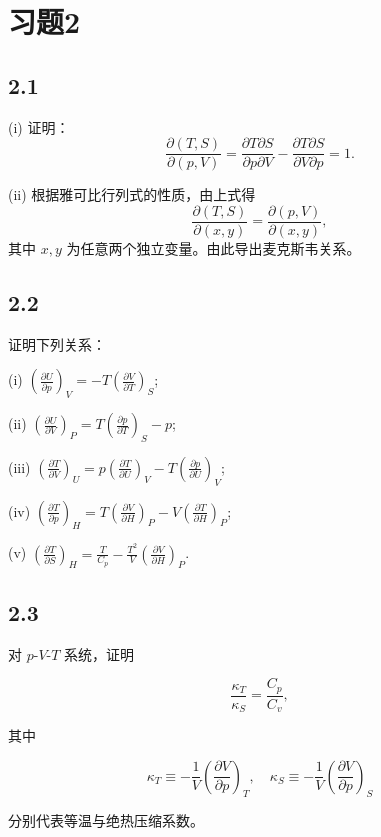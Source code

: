 \section{习题2}

\newpage
\subsection{2.1}
(i) 证明：$$\frac{\partial (T, S)}{\partial (p, V)} = \frac{\partial T \partial S}{\partial p \partial V} - \frac{\partial T \partial S}{\partial V \partial p} = 1.$$

(ii) 根据雅可比行列式的性质，由上式得 $$\frac{\partial (T, S)}{\partial (x, y)} = \frac{\partial (p, V)}{\partial (x, y)},$$ 其中 $x, y$ 为任意两个独立变量。由此导出麦克斯韦关系。

\newpage
\subsection{2.2}
证明下列关系：

(i) $\left( \frac{\partial U}{\partial p} \right)_V = - T \left( \frac{\partial V}{\partial T} \right)_S$;

(ii) $\left( \frac{\partial U}{\partial V} \right)_P = T \left( \frac{\partial p}{\partial T} \right)_S - p$;

(iii) $\left( \frac{\partial T}{\partial V} \right)_U = p \left( \frac{\partial T}{\partial U} \right)_V - T \left( \frac{\partial p}{\partial U} \right)_V$;

(iv) $\left( \frac{\partial T}{\partial p} \right)_H = T \left( \frac{\partial V}{\partial H} \right)_P - V \left( \frac{\partial T}{\partial H} \right)_P$;

(v) $\left( \frac{\partial T}{\partial S} \right)_H = \frac{T}{C_p} - \frac{T^2}{V} \left( \frac{\partial V}{\partial H} \right)_P$.

\newpage
\subsection{2.3}
对 $p$-$V$-$T$ 系统，证明

$$\frac{\kappa_T}{\kappa_S} = \frac{C_p}{C_v},$$

其中

$$\kappa_T \equiv -\frac{1}{V} \left( \frac{\partial V}{\partial p} \right)_T, \quad \kappa_S \equiv -\frac{1}{V} \left( \frac{\partial V}{\partial p} \right)_S$$

分别代表等温与绝热压缩系数。

